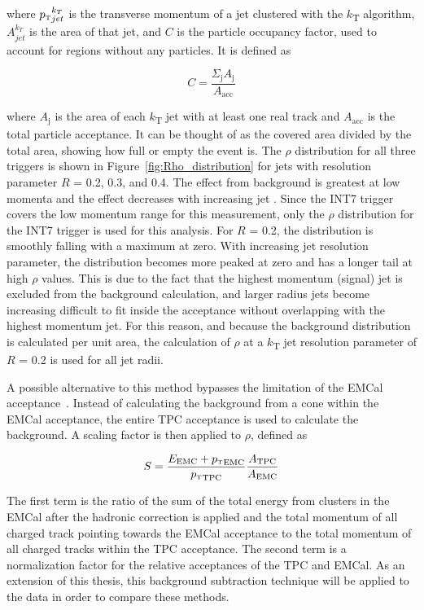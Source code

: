 \noindent
where ${\text{$p_{\mbox{\tiny T}}$}}_{jet}^{k_T}$ is the transverse momentum of a jet clustered with the $k$\textsubscript{T} algorithm, $A_{jet}^{k_T}$ is the area of that jet, and $C$ is the particle occupancy factor, used to account for regions without any particles. It is defined as

\begin{equation}
    C = \frac{\Sigma_{\text{j}}A_{\text{j}}}{A_{\text{acc}}}
\end{equation}

\noindent
where $A_\text{j}$ is the area of each $k$\textsubscript{T} jet with at least one real track and $A_{\text{acc}}$ is the total particle acceptance. It can be thought of as the covered area divided by the total area, showing how full or empty the event is. The $\rho$ distribution for all three triggers is shown in Figure~\ref{fig:Rho_distribution} for jets with resolution parameter $R$ = 0.2, 0.3, and 0.4. The effect from background is greatest at low momenta and the effect decreases with increasing jet \pT. Since the INT7 trigger covers the low momentum range for this measurement, only the $\rho$ distribution for the INT7 trigger is used for this analysis. For $R$ = 0.2, the distribution is smoothly falling with a maximum at zero. With increasing jet resolution parameter, the distribution becomes more peaked at zero and has a longer tail at high $\rho$ values. This is due to the fact that the highest momentum (signal) jet is excluded from the background calculation, and larger radius jets become increasing difficult to fit inside the acceptance without overlapping with the highest momentum jet. For this reason, and because the background distribution is calculated per unit area, the calculation of $\rho$ at a $k$\textsubscript{T} jet resolution parameter of $R$ = 0.2 is used for all jet radii.

A possible alternative to this method bypasses the limitation of the EMCal acceptance~\cite{anaNoteMConnors}. Instead of calculating the background from a cone within the EMCal acceptance, the entire TPC acceptance is used to calculate the background. A scaling factor is then applied to $\rho$, defined as 

\begin{equation}
    S = \frac{E_{\text{EMC}}+\text{$p_{\mbox{\tiny T}}$}_\text{EMC}}{\text{$p_{\mbox{\tiny T}}$}_\text{TPC}}\frac{A_{\text{TPC}}}{A_{\text{EMC}}}
\end{equation}

\noindent
The first term is the ratio of the sum of the total energy from clusters in the EMCal after the hadronic correction is applied and the total momentum of all charged track pointing towards the EMCal acceptance to the total momentum of all charged tracks within the TPC acceptance. The second term is a normalization factor for the relative acceptances of the TPC and EMCal. As an extension of this thesis, this background subtraction technique will be applied to the \pPb data in order to compare these methods.


